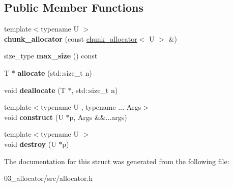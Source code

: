 \subsection*{Public Member Functions}
\begin{DoxyCompactItemize}
\item 
\mbox{\label{structchunk__allocator_aa08c31de16f4cf2d81e14ba954e2670a}} 
{\footnotesize template$<$typename U $>$ }\\{\bfseries chunk\+\_\+allocator} (const \hyperlink{structchunk__allocator}{chunk\+\_\+allocator}$<$ U $>$ \&)
\item 
\mbox{\label{structchunk__allocator_af2296b221a61fba50dad26590cb3b0b3}} 
size\+\_\+type {\bfseries max\+\_\+size} () const
\item 
\mbox{\label{structchunk__allocator_a1f47dd8132c685150b67bf363478a5c6}} 
T $\ast$ {\bfseries allocate} (std\+::size\+\_\+t n)
\item 
\mbox{\label{structchunk__allocator_ac0b800a361623f1e88a2ef8e5e521669}} 
void {\bfseries deallocate} (T $\ast$, std\+::size\+\_\+t n)
\item 
\mbox{\label{structchunk__allocator_aa5a147ff744f87daad8127d5a241bbfb}} 
{\footnotesize template$<$typename U , typename ... Args$>$ }\\void {\bfseries construct} (U $\ast$p, Args \&\&...args)
\item 
\mbox{\label{structchunk__allocator_adbcf12c0be19a57d3fe6ca5a87450ebf}} 
{\footnotesize template$<$typename U $>$ }\\void {\bfseries destroy} (U $\ast$p)
\end{DoxyCompactItemize}


The documentation for this struct was generated from the following file\+:\begin{DoxyCompactItemize}
\item 
03\+\_\+allocator/src/allocator.\+h\end{DoxyCompactItemize}
